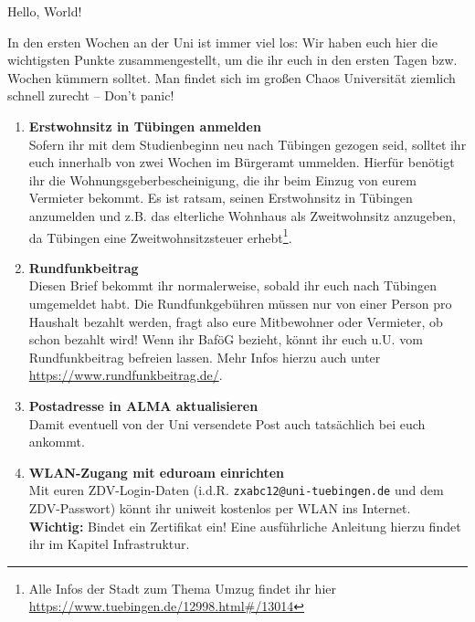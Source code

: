 
Hello, World!

In den ersten Wochen an der Uni ist immer viel los: Wir haben euch hier die wichtigsten Punkte zusammengestellt, um die ihr euch in den ersten Tagen bzw. Wochen kümmern solltet. Man findet sich im großen Chaos Universität ziemlich schnell zurecht -- Don't panic!
  
  \begin{enumerate}[label=$\bigcirc$]
  	\item \textbf{Erstwohnsitz in Tübingen anmelden} \\
  		Sofern ihr mit dem Studienbeginn neu nach Tübingen gezogen seid, solltet ihr euch innerhalb von zwei Wochen im Bürgeramt ummelden. Hierfür benötigt ihr die Wohnungsgeberbescheinigung, die ihr beim Einzug von eurem Vermieter bekommt. Es ist ratsam, seinen Erstwohnsitz in Tübingen anzumelden und z.B. das elterliche Wohnhaus als Zweitwohnsitz anzugeben, da Tübingen eine Zweitwohnsitzsteuer erhebt\footnote{Alle Infos der Stadt zum Thema Umzug findet ihr hier \url{https://www.tuebingen.de/12998.html\#/13014}}.\\
  	
	\item \textbf{Rundfunkbeitrag} \\
		Diesen Brief bekommt ihr normalerweise, sobald ihr euch nach Tübingen umgemeldet habt. Die Rundfunkgebühren müssen nur von einer Person pro Haushalt bezahlt werden, fragt also eure Mitbewohner oder Vermieter, ob schon bezahlt wird! Wenn ihr BaföG bezieht, könnt ihr euch u.U. vom Rundfunkbeitrag befreien lassen. Mehr Infos hierzu auch unter \url{https://www.rundfunkbeitrag.de/}.
  	
  	\item \textbf{Postadresse in ALMA aktualisieren}\\
  		Damit eventuell von der Uni versendete Post auch tatsächlich bei euch ankommt.
  	
  	\item \textbf{WLAN-Zugang mit eduroam einrichten}\\
  		Mit euren ZDV-Login-Daten (i.d.R. \texttt{zxabc12@uni-tuebingen.de} und dem ZDV-Passwort) könnt ihr uniweit kostenlos per WLAN ins Internet. \textbf{Wichtig:} Bindet ein Zertifikat ein! Eine ausführliche Anleitung hierzu findet ihr im Kapitel Infrastruktur.
  	

\end{enumerate}
